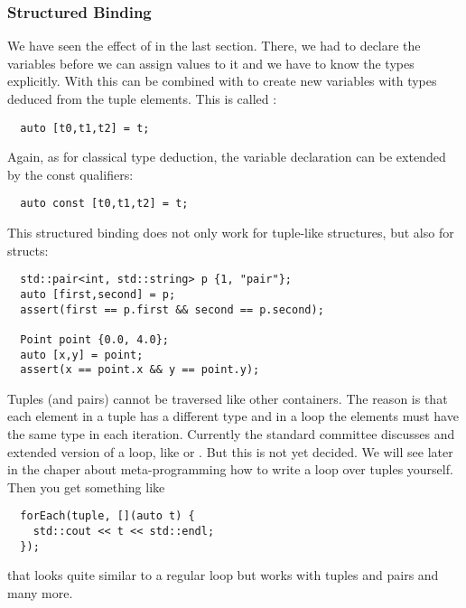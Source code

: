 \subsubsection{Structured Binding}
We have seen the effect of  in the last section. There, we had to declare the variables before we can assign
values to it and we have to know the types explicitly. With\marginpar{[\cxx{17}]}  this can be combined with 
to create new variables with types deduced from the tuple elements. This is called :
%
\begin{verbatim}
  auto [t0,t1,t2] = t;
\end{verbatim}
%
Again, as for classical  type deduction, the variable declaration can be extended by the const
qualifiers:
%
\begin{verbatim}
  auto const [t0,t1,t2] = t;
\end{verbatim}


This structured binding does not only work for tuple-like structures, but also for structs:
%
\begin{verbatim}
  std::pair<int, std::string> p {1, "pair"};
  auto [first,second] = p;
  assert(first == p.first && second == p.second);

  Point point {0.0, 4.0};
  auto [x,y] = point;
  assert(x == point.x && y == point.y);
\end{verbatim}

\begin{rem}
Tuples (and pairs) cannot be traversed like other containers. The reason is that each element in a tuple has a different type and in a loop the elements must have the same type in each iteration. Currently the standard committee discusses and extended version of a loop, like  or . But this is not yet decided. We will see later in the chaper about meta-programming how to write a loop over tuples yourself. Then you get something like
\begin{verbatim}
  forEach(tuple, [](auto t) {
    std::cout << t << std::endl;
  });
\end{verbatim}
that looks quite similar to a regular loop but works with tuples and pairs and many more.
\end{rem}
